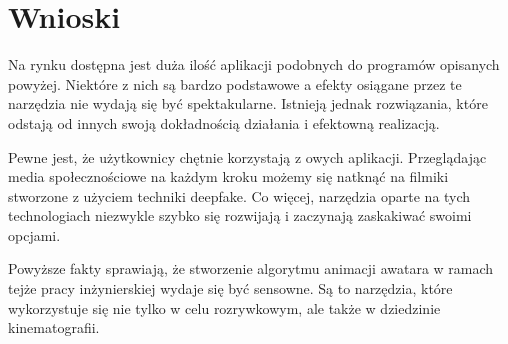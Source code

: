 
\section{Wnioski}
Na rynku dostępna jest duża ilość aplikacji podobnych do programów opisanych powyżej. Niektóre z nich są bardzo podstawowe a efekty osiągane przez te narzędzia nie wydają się być spektakularne. Istnieją jednak rozwiązania, które odstają od innych swoją dokładnością działania i efektowną realizacją. 

Pewne jest, że użytkownicy chętnie korzystają z owych aplikacji. Przeglądając media społecznościowe na każdym kroku możemy się natknąć na filmiki stworzone z użyciem techniki deepfake. Co więcej, narzędzia oparte na tych technologiach niezwykle szybko się rozwijają i zaczynają zaskakiwać swoimi opcjami.

Powyższe fakty sprawiają, że stworzenie algorytmu animacji awatara w ramach tejże pracy inżynierskiej wydaje się być sensowne. Są to narzędzia, które wykorzystuje się nie tylko w celu rozrywkowym, ale także w dziedzinie kinematografii. 


